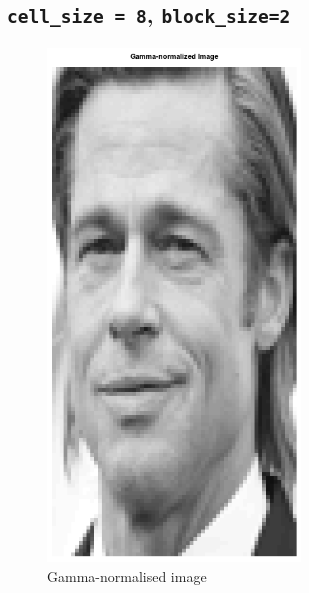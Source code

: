 \documentclass[a4paper]{article}
\begin{document}
\subsection{\texttt{cell_size = 8}, \texttt{block_size=2}}
\noindent
\begin{minipage}{0.49\textwidth}
\begin{figure}[H]
    \centering
    \includegraphics[width=0.6\textwidth]{./images/2_1_gamma-normalised.png}
    \caption{Gamma-normalised image}
\end{figure}
\end{minipage}
\hfill
\end{document}
